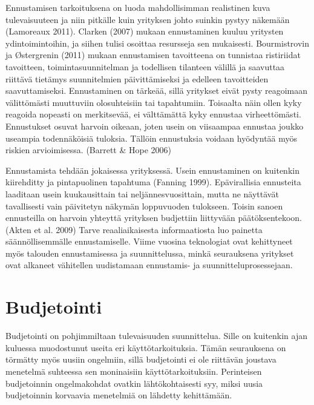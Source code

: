 \documentclass[12pt,a4paper,oneside,pdftex]{report}
\begin{document}
Ennustamisen tarkoituksena on luoda mahdollisimman realistinen kuva tulevaisuuteen ja niin pitkälle kuin yrityksen johto suinkin pystyy näkemään (Lamoreaux 2011). Clarken (2007) mukaan ennustaminen kuuluu yritysten ydintoimintoihin, ja siihen tulisi osoittaa resursseja sen mukaisesti. Bourmistrovin ja Østergrenin (2011) mukaan ennustamisen tavoitteena on tunnistaa ristiriidat tavoitteen, toimintasuunnitelman ja todellisen tilanteen välillä ja saavuttaa riittävä tietämys suunnitelmien päivittämiseksi ja edelleen tavoitteiden saavuttamiseksi. Ennustaminen on tärkeää, sillä yritykset eivät pysty reagoimaan välittömästi muuttuviin olosuhteisiin tai tapahtumiin. Toisaalta näin ollen kyky reagoida nopeasti on merkitsevää, ei välttämättä kyky ennustaa virheettömästi. Ennustukset osuvat harvoin oikeaan, joten usein on viisaampaa ennustaa joukko useampia todennäköisiä tuloksia. Tällöin ennustuksia voidaan hyödyntää myös riskien arvioimisessa. (Barrett & Hope 2006)

Ennustamista tehdään jokaisessa yrityksessä. Usein ennustaminen on kuitenkin kiirehditty ja pintapuolinen tapahtuma (Fanning 1999). Epävirallisia ennusteita laaditaan usein kuukausittain tai neljännesvuosittain, mutta ne näyttävät tavallisesti vain päivitetyn näkymän loppuvuoden tulokseen. Toisin sanoen ennusteilla on harvoin yhteyttä yrityksen budjettiin liittyvään päätöksentekoon. (Akten et al. 2009) Tarve reaaliaikaisesta informaatiosta luo painetta säännöllisemmälle ennustamiselle. Viime vuosina teknologiat ovat kehittyneet myös talouden ennustamisessa ja suunnittelussa, minkä seurauksena yritykset ovat alkaneet vähitellen uudistamaan ennustamis- ja suunnitteluprosessejaan.

\section{Budjetointi}

Budjetointi on pohjimmiltaan tulevaisuuden suunnittelua. Sille on kuitenkin ajan kuluessa muodostunut useita eri käyttötarkoituksia. Tämän seurauksena on törmätty myös uusiin ongelmiin, sillä budjetointi ei ole riittävän joustava menetelmä suhteessa sen moninaisiin käyttötarkoituksiin. Perinteisen budjetoinnin ongelmakohdat ovatkin lähtökohtaisesti syy, miksi uusia budjetoinnin korvaavia menetelmiä on lähdetty kehittämään.
\end{document}
